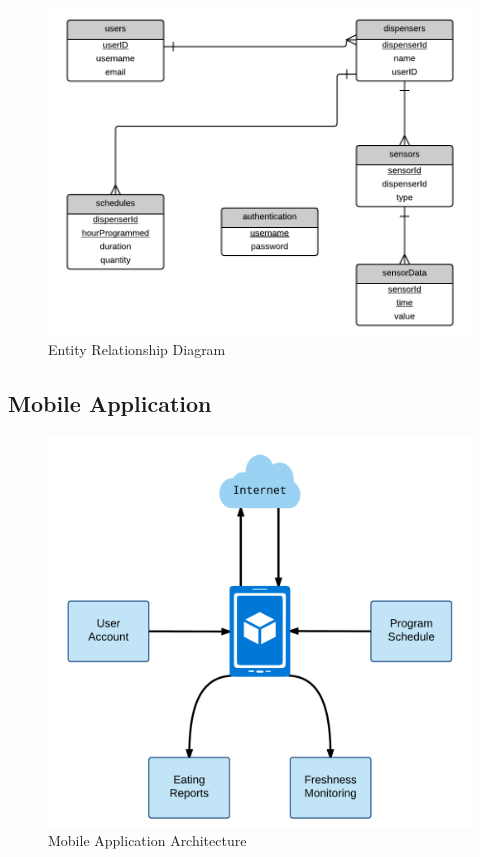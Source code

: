 \documentclass[12pt]{article}
\begin{document}
\begin{figure}[!htb]
  \begin{center}
    \includegraphics[scale=0.35]{Figures/EntityRelationship}
  \end{center}
  \caption{Entity Relationship Diagram}
  \label{fig:EntityRelationship}
\end{figure}


\subsection{Mobile Application}

\begin{figure}[!htb]
  \begin{center}
    \includegraphics[scale=0.2]{Figures/ArchitectureApplication}
  \end{center}
  \caption{Mobile Application Architecture}
  \label{fig:AppArchitecture}
\end{figure}
\end{document}
